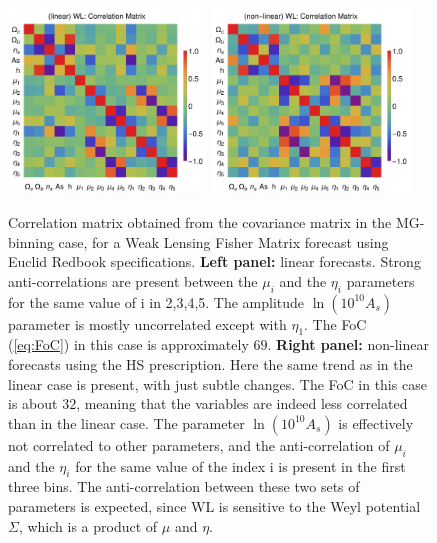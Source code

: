 \begin{figure}[htbp]
\centering
\includegraphics[width=0.47\textwidth]{Chapters/linear-nonlinear-MG-forecasts/figures/Decorrelations-WL/correlation-full-fiducialMGBin3-Euclid-WL-linearPK-}
\includegraphics[width=0.47\textwidth]{Chapters/linear-nonlinear-MG-forecasts/figures/Decorrelations-WL/correlation-full-fiducialMGBin3-Euclid-WL-nonlinearPk__Zhao-}
\caption[Correlation matrices for a WL Euclid forecast.]{\label{fig:WLcorr}
Correlation matrix obtained from the covariance matrix in the MG-binning case, for a Weak Lensing Fisher Matrix forecast using Euclid
Redbook specifications. \textbf{Left panel:} linear forecasts. Strong anti-correlations are present between the $\mu_i$ and the $\eta_i$ parameters for the same value of i in {2,3,4,5}. The amplitude $\ln(10^{10}A_{s})$ parameter is mostly uncorrelated except with $\eta_1$. 
The FoC (\ref{eq:FoC}) in this case is approximately $69$.
\textbf{Right panel:} non-linear 
forecasts using the HS prescription. Here the same trend as in the linear case is present, with just subtle changes. 
The FoC in this case is about $32$, meaning that the variables are indeed less correlated than in the linear case. 
The parameter $\ln(10^{10}A_{s})$ is effectively not correlated to other parameters, 
and the anti-correlation of $\mu_{i}$ and the $\eta_{i}$ for the same value of the index i is present in the first three bins. 
The anti-correlation between these two sets of parameters
is expected, since WL is sensitive to the Weyl potential $\Sigma$, which is a product of $\mu$ and $\eta$.}
\end{figure}

